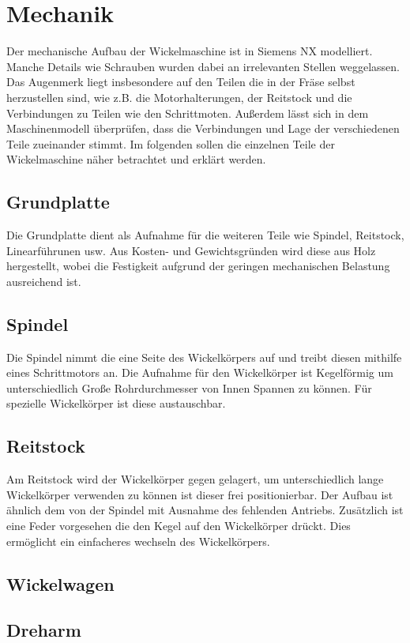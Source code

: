 \documentclass[12pt, a4paper, ngerman]{article}
\begin{document}
\section{Mechanik}
Der mechanische Aufbau der Wickelmaschine ist in Siemens NX modelliert. Manche Details wie Schrauben wurden dabei an irrelevanten Stellen weggelassen. Das Augenmerk liegt insbesondere auf den Teilen die in der Fräse selbst herzustellen sind, wie z.B. die Motorhalterungen, der Reitstock und die Verbindungen zu Teilen wie den Schrittmoten. Außerdem lässt sich in dem Maschinenmodell überprüfen, dass die Verbindungen und Lage der verschiedenen Teile zueinander stimmt. Im folgenden sollen die einzelnen Teile der Wickelmaschine näher betrachtet und erklärt werden.

\subsection{Grundplatte}
Die Grundplatte dient als Aufnahme für die weiteren Teile wie Spindel, Reitstock, Linearführunen usw. Aus Kosten- und Gewichtsgründen wird diese aus Holz hergestellt, wobei die Festigkeit aufgrund der geringen mechanischen Belastung ausreichend ist.

\subsection{Spindel}
Die Spindel nimmt die eine Seite des Wickelkörpers auf und treibt diesen mithilfe eines Schrittmotors an. Die Aufnahme für den Wickelkörper ist Kegelförmig um unterschiedlich Große Rohrdurchmesser von Innen Spannen zu können. Für spezielle Wickelkörper ist diese austauschbar.


\subsection{Reitstock}
Am Reitstock wird der Wickelkörper gegen gelagert, um unterschiedlich lange Wickelkörper verwenden zu können ist dieser frei positionierbar. Der Aufbau ist ähnlich dem von der Spindel mit Ausnahme des fehlenden Antriebs. Zusätzlich ist eine Feder vorgesehen die den Kegel auf den Wickelkörper drückt. Dies ermöglicht ein einfacheres wechseln des Wickelkörpers.  


\subsection{Wickelwagen}

\subsection{Dreharm}
\end{document}

